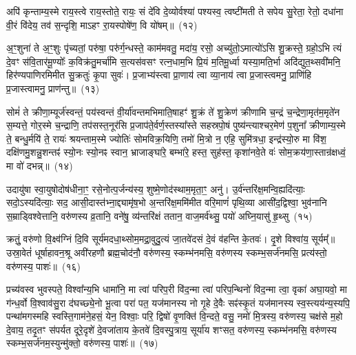 अपि॑ कृन्ताम्य॒स्मे राय॒स्त्वे राय॒स्तोते॒ रायः॒ सं दे॑वि दे॒व्योर्वश्या॑ पश्यस्व॒ त्वष्टी॑मती ते सपेय सु॒रेता॒ रेतो॒ दधा॑ना वी॒रं वि॑देय॒ तव॑ स॒न्दृशि॒ मा\-ऽहꣳ रा॒यस्पोषे॑ण॒ वि यो॑षम्॥~(१२)\ip

{\anuvakamend[{अ॒स्य॒ ग्री॒वा एका॒न्नत्रि॒ꣳ॒शच्च॑}]}

अ॒ꣳ॒शुना॑ ते अ॒ꣳ॒शुः पृ॑च्यतां॒ परु॑षा॒ परु॑र्ग॒न्धस्ते॒ काम॑मवतु॒ मदा॑य॒ रसो॒ अच्यु॑तो॒\-ऽमात्यो॑\-ऽसि शु॒क्रस्ते॒ ग्रहो॒\-ऽभि त्यं दे॒वꣳ स॑वि॒तार॑मू॒ण्योः᳚ क॒विक्र॑तु॒मर्चा॑मि स॒त्यस॑वसꣳ रत्न॒धाम॒भि प्रि॒यं म॒तिमू॒र्ध्वा यस्या॒मति॒र्भा अदि॑द्युत॒थ्सवी॑मनि॒ हिर॑ण्यपाणिरमिमीत सु॒क्रतुः॑ कृ॒पा सुवः॑। प्र॒जाभ्य॑स्त्वा प्रा॒णाय॑ त्वा व्या॒नाय॑ त्वा प्र॒जास्त्वमनु॒ प्राणि॑हि प्र॒जास्त्वामनु॒ प्राण॑न्तु॥~(१३)\ip

{\anuvakamend[{अनु॑ स॒प्त च॑}]}

सोमं॑ ते क्रीणा॒म्यूर्ज॑स्वन्तं॒ पय॑स्वन्तं वी॒र्या॑वन्तमभिमाति॒\-षाहꣳ॑ शु॒क्रं ते॑ शु॒क्रेण॑ क्रीणामि च॒न्द्रं च॒न्द्रेणा॒मृत॑म॒मृते॑न स॒म्यत्ते॒ गोर॒स्मे च॒न्द्राणि॒ तप॑सस्त॒नूर॑सि प्र॒जा\-प॑ते॒र्वर्ण॒स्तस्या᳚स्ते सहस्रपो॒षं पुष्य॑न्त्याश्चर॒मेण॑ प॒शुना᳚ क्रीणाम्य॒स्मे ते॒ बन्धु॒र्मयि॑ ते॒ रायः॑ श्रयन्ताम॒स्मे ज्योतिः॑ सोम\-विक्र॒यिणि॒ तमो॑ मि॒त्रो न॒ एहि॒ सुमि॑त्रधा॒ इन्द्र॑स्यो॒रु मा वि॑श॒ दक्षि॑णमु॒शन्नु॒शन्तꣴ॑ स्यो॒नः स्यो॒नꣴ स्वान॒ भ्राजाङ्घा॑रे॒ बम्भा॑रे॒ हस्त॒ सुह॑स्त॒ कृशा॑नवे॒ते वः॑ सोम॒\-क्रय॑णा॒स्तान्र॑क्षध्वं॒ मा वो॑ दभन्न्॥~(१४)\ip

{\anuvakamend[{ऊ॒रुं द्वाविꣳ॑शतिश्व}]}

उदायु॑षा स्वा॒युषोदोष॑धीना॒ꣳ॒ रसे॒नोत्प॒र्जन्य॑स्य॒ शुष्मे॒णोद॑स्था\-म॒मृता॒ꣳ॒ अनु॑। उ॒र्व॑न्तरि॑क्ष॒मन्वि॒ह्यदि॑त्याः॒ सदो॒\-ऽस्यदि॑त्याः॒ सद॒ आसी॒\-दास्त॑भ्ना॒द्द्यामृ॑ष॒भो अ॒न्तरि॑क्ष॒ममि॑मीत वरि॒माणं॑ पृथि॒व्या आसी॑द॒द्विश्वा॒ भुव॑नानि स॒म्राड्विश्वेत्तानि॒ वरु॑णस्य व्र॒तानि॒ वने॑षु॒ व्य॑न्तरि॑क्षं ततान॒ वाज॒मर्व॑थ्सु॒ पयो॑ अघ्नि॒यासु॑ हृ॒थ्सु~(१५)\ip

क्रतुं॒ वरु॑णो वि॒क्ष्व॑ग्निं दि॒वि सूर्य॑मदधा॒थ्सोम॒मद्रा॒वुदु॒त्यं जा॒तवे॑दसं दे॒वं व॑हन्ति के॒तवः॑। दृ॒शे विश्वा॑य॒ सूर्यम्᳚॥ उस्रा॒वेतं॑ धूर्\mbox{}षाहावन॒श्रू अवी॑रहणौ ब्रह्म॒चोद॑नौ॒ वरु॑णस्य॒ स्कम्भ॑नमसि॒ वरु॑णस्य स्कम्भ॒सर्ज॑नमसि॒ प्रत्य॑स्तो॒ वरु॑णस्य॒ पाशः॑॥~(१६)\ip

{\anuvakamend[{हृ॒थ्सु पञ्च॑त्रिꣳशच्च}]}

प्रच्य॑वस्व भुवस्पते॒ विश्वा᳚न्य॒भि धामा॑नि॒ मा त्वा॑ परिप॒री वि॑द॒न्मा त्वा॑ परिप॒न्थिनो॑ विद॒न्मा त्वा॒ वृका॑ अघा॒यवो॒ मा ग॑न्ध॒र्वो वि॒श्वाव॑सु॒रा द॑घच्छ्ये॒नो भू॒त्वा परा॑ पत॒ यज॑मानस्य नो गृ॒हे दे॒वैः सꣴ॑स्कृ॒तं यज॑मानस्य स्व॒स्त्यय॑न्य॒स्यपि॒ पन्था॑मगस्महि स्वस्ति॒गाम॑ने॒हसं॒ येन॒ विश्वाः॒ परि॒ द्विषो॑ वृ॒णक्ति॑ वि॒न्दते॒ वसु॒ नमो॑ मि॒त्रस्य॒ वरु॑णस्य॒ चक्ष॑से म॒हो दे॒वाय॒ तदृ॒तꣳ स॑पर्यत दूरे॒\-दृशे॑ दे॒व\-जा॑ताय के॒तवे॑ दि॒वस्पु॒त्राय॒ सूर्या॑य शꣳसत॒ वरु॑णस्य॒ स्कम्भ॑\-नमसि॒ वरु॑णस्य स्कम्भ॒\-सर्ज॑नम॒स्युन्मु॑क्तो॒ वरु॑णस्य॒ पाशः॑॥~(१७)\ip

